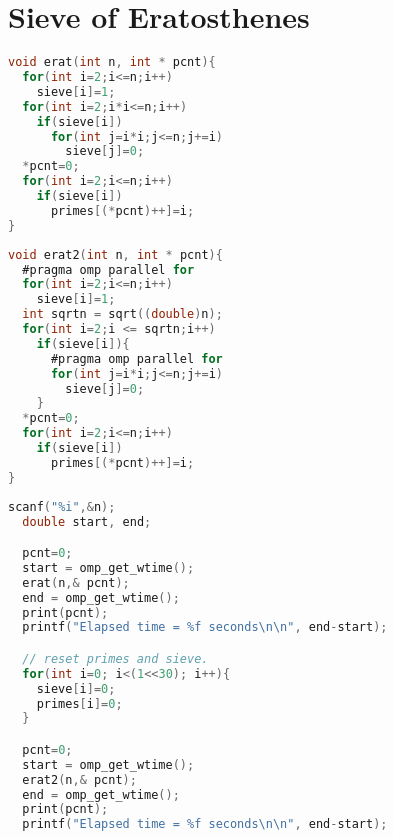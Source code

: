 \documentclass[12pt]{article}
\begin{document}
\section*{Sieve of Eratosthenes}
\begin{lstlisting}[frame=single,language=C,caption=Non-parallelized Sieve of Eratosthenes (prime.c) \label{code:prime-sieve-nonparallelized}]
void erat(int n, int * pcnt){
  for(int i=2;i<=n;i++)
    sieve[i]=1;
  for(int i=2;i*i<=n;i++)
    if(sieve[i])
      for(int j=i*i;j<=n;j+=i)
        sieve[j]=0;
  *pcnt=0;
  for(int i=2;i<=n;i++)
    if(sieve[i])
      primes[(*pcnt)++]=i; 
}
\end{lstlisting}
\begin{lstlisting}[frame=single,language=C,caption=Parllelized Sieve of Eratosthenes (prime.c) \label{code:prime-sieve-parallelized}]
void erat2(int n, int * pcnt){
  #pragma omp parallel for
  for(int i=2;i<=n;i++)
    sieve[i]=1;
  int sqrtn = sqrt((double)n);
  for(int i=2;i <= sqrtn;i++)
    if(sieve[i]){
      #pragma omp parallel for
      for(int j=i*i;j<=n;j+=i)
        sieve[j]=0;
    }
  *pcnt=0;
  for(int i=2;i<=n;i++)
    if(sieve[i])
      primes[(*pcnt)++]=i; 
}
\end{lstlisting}
\newpage
\begin{lstlisting}[frame=single,language=C,caption=Measuring Runtime Performance (prime.c) \label{code:prime-sieve-runtime}]
  scanf("%i",&n);
  double start, end;

  pcnt=0;
  start = omp_get_wtime();
  erat(n,& pcnt);
  end = omp_get_wtime();
  print(pcnt);
  printf("Elapsed time = %f seconds\n\n", end-start);

  // reset primes and sieve.
  for(int i=0; i<(1<<30); i++){
    sieve[i]=0;
    primes[i]=0;
  }

  pcnt=0;
  start = omp_get_wtime();
  erat2(n,& pcnt);
  end = omp_get_wtime();
  print(pcnt);
  printf("Elapsed time = %f seconds\n\n", end-start);
\end{lstlisting}
\begin{lstlisting}[frame=single,language=Bash,caption=Output in Terminal from prime sieve program (prime.c) \label{code:prime-sieve-terminal-output}]

\end{lstlisting}

\newpage
\end{document}
